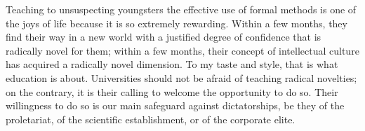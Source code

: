 \documentclass[a4paper,12pt]{article}
\begin{document}
Teaching to unsuspecting youngsters the effective use of formal methods
is one of the joys of life because it is so extremely rewarding.  Within
a few months, they find their way in a new world with a justified degree
of confidence that is radically novel for them; within a few months,
their concept of intellectual culture has acquired a radically novel
dimension.  To my taste and style, that is what education is about.
Universities should not be afraid of teaching radical novelties; on the
contrary, it is their calling to welcome the opportunity to do so.
Their willingness to do so is our main safeguard against dictatorships,
be they of the proletariat, of the scientific establishment, or of the
corporate elite.
\end{document}

